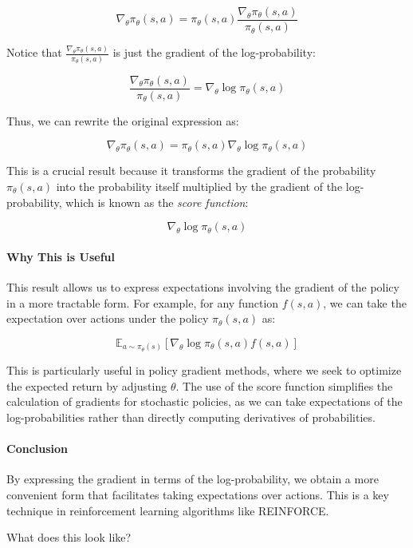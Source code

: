 \documentclass[10pt, oneside]{article}
\theoremstyle{definition}
\begin{document}
\[
\nabla_\theta \pi_\theta(s, a) = \pi_\theta(s, a) \frac{\nabla_\theta \pi_\theta(s, a)}{\pi_\theta(s, a)}
\]

Notice that $\frac{\nabla_\theta \pi_\theta(s, a)}{\pi_\theta(s, a)}$ is just the gradient of the log-probability:

\[
\frac{\nabla_\theta \pi_\theta(s, a)}{\pi_\theta(s, a)} = \nabla_\theta \log \pi_\theta(s, a)
\]

Thus, we can rewrite the original expression as:

\[
\nabla_\theta \pi_\theta(s, a) = \pi_\theta(s, a) \nabla_\theta \log \pi_\theta(s, a)
\]

This is a crucial result because it transforms the gradient of the probability $\pi_\theta(s, a)$ into the probability itself multiplied by the gradient of the log-probability, which is known as the \textit{score function}:

\[
\nabla_\theta \log \pi_\theta(s, a)
\]

\paragraph{Why This is Useful}

This result allows us to express expectations involving the gradient of the policy in a more tractable form. For example, for any function $f(s, a)$, we can take the expectation over actions under the policy $\pi_\theta(s, a)$ as:

\[
\mathbb{E}_{a \sim \pi_\theta(s)} \left[ \nabla_\theta \log \pi_\theta(s, a) f(s, a) \right]
\]

This is particularly useful in policy gradient methods, where we seek to optimize the expected return by adjusting $\theta$. The use of the score function simplifies the calculation of gradients for stochastic policies, as we can take expectations of the log-probabilities rather than directly computing derivatives of probabilities.

\paragraph{Conclusion}

By expressing the gradient in terms of the log-probability, we obtain a more convenient form that facilitates taking expectations over actions. This is a key technique in reinforcement learning algorithms like REINFORCE.



What does this look like?
\end{document}
